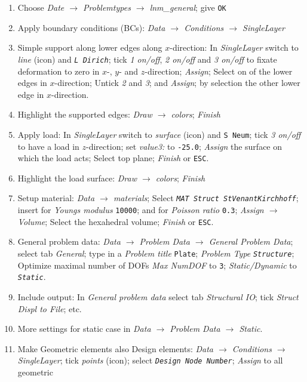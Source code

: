 \begin{enumerate}
\item Choose \emph{Date $\rightarrow$ Problemtypes $\rightarrow$ lnm\_general};
give \texttt{OK}
\item Apply boundary conditions (BCs): \emph{Data $\rightarrow$ Conditions
$\rightarrow$ SingleLayer}
\item Simple support along lower edges along $x$-direction: In \emph{SingleLayer}
switch to \emph{line} (icon) and \texttt{\emph{L Dirich}}; tick \emph{1
on/off}, \emph{2 on/off} and \emph{3 on/off} to fixate deformation
to zero in $x$-, $y$- and $z$-direction; \emph{Assign}; Select
on of the lower edges in $x$-direction; Untick \emph{2} and \emph{3};
and \emph{Assign}; by selection the other lower edge in $x$-direction. 
\item Highlight the supported edges: \emph{Draw $\rightarrow$ colors};
\emph{Finish}
\item Apply load: In \emph{SingleLayer} switch to \emph{surface} (icon)
and \texttt{S Neum}; tick \emph{3 on/off} to have a load in $z$-direction;
set \emph{value3:} to \texttt{-25.0}; \emph{Assign} the surface on
which the load acts; Select top plane; \emph{Finish} or \texttt{ESC}. 
\item Highlight the load surface: \emph{Draw $\rightarrow$ colors}; \emph{Finish}
\item Setup material: \emph{Data $\rightarrow$ materials}; Select \texttt{\emph{MAT
Struct StVenantKirchhoff}}; insert for \emph{Youngs modulus} \texttt{10000};
and for \emph{Poisson ratio} \texttt{0.3}; \emph{Assign $\rightarrow$
Volume}; Select the hexahedral volume; \emph{Finish} or \texttt{ESC}. 
\item General problem data: \emph{Data $\rightarrow$ Problem Data $\rightarrow$
General Problem Data}; select tab \emph{General}; type in a \emph{Problem
title} \texttt{Plate}; \emph{Problem Type} \texttt{\emph{Structure}};
Optimize maximal number of DOFs \emph{Max NumDOF} to \texttt{3}; \emph{Static/Dynamic}
to \texttt{\emph{Static}}. 
\item Include output: In \emph{General problem data} select tab \emph{Structural
IO}; tick \emph{Struct Displ to File}; etc. 
\item More settings for static case in \emph{Data $\rightarrow$ Problem
Data $\rightarrow$ Static}. 
\item Make Geometric elements also Design elements: \emph{Data $\rightarrow$
Conditions $\rightarrow$ SingleLayer}; tick \emph{points} (icon);
select \texttt{\emph{Design Node Number}}; \emph{Assign} to all geometric

\end{enumerate}
